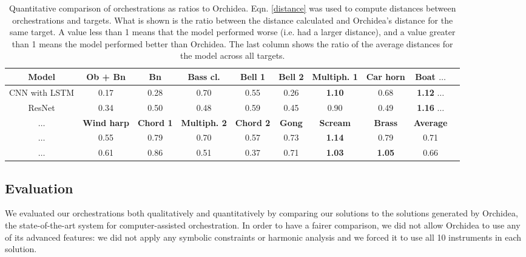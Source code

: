 \documentclass[runningheads,a4paper]{llncs}
\begin{document}
\begin{table}
  \centering
     \caption{Quantitative comparison of orchestrations as ratios to Orchidea. Eqn. \ref{distance} was used to compute distances between orchestrations and targets. What is shown is the ratio between the distance calculated and Orchidea's distance for the same target. A value less than 1 means that the model performed worse (i.e. had a larger distance), and a value greater than 1 means the model performed better than Orchidea. The last column shows the ratio of the average distances for the model across all targets.}\label{orch_eval}
	\centering    
    \begin{tabular}{|c|c|c|c|c|c|c|c|c|c}
     \hline
      \textbf{Model} & \textbf{Ob + Bn} & \textbf{Bn} & \textbf{Bass cl.} & \textbf{Bell 1} & \textbf{Bell 2} & \textbf{Multiph. 1} & \textbf{Car horn} & \textbf{Boat} $\ldots$ \\
      \hline
      CNN with LSTM & 0.17 & 0.28 & 0.70 & 0.55 & 0.26 & \textbf{1.10} & 0.68 & \textbf{1.12} $\ldots$  \\
      \hline
      ResNet & 0.34 & 0.50 & 0.48 & 0.59 & 0.45 & 0.90 & 0.49 & \textbf{1.16} $\ldots$ \\
      \hline
      \hline
      \textbf{$\ldots$} & \textbf{Wind harp} & \textbf{Chord 1} & \textbf{Multiph. 2} & \textbf{Chord 2} & \textbf{Gong} & \textbf{Scream} & \textbf{Brass} & \textbf{Average}  \\
      \hline
      $\ldots$ & 0.55 & 0.79 & 0.70 & 0.57 & 0.73 & \textbf{1.14} & 0.79 & 0.71\\
      \hline
      $\ldots$  & 0.61 & 0.86 & 0.51 & 0.37 & 0.71 & \textbf{1.03} & \textbf{1.05} & 0.66 \\
      \hline
    \end{tabular}

\end{table}

\subsection{Evaluation}

We evaluated our orchestrations both qualitatively and quantitatively by comparing our solutions to the solutions generated by Orchidea, the state-of-the-art system for computer-assisted orchestration. 
In order to have a fairer comparison, we did not allow Orchidea to use any of its advanced features: we did not apply any symbolic constraints or harmonic analysis and we forced it to use all 10 instruments in each solution.
\end{document}
